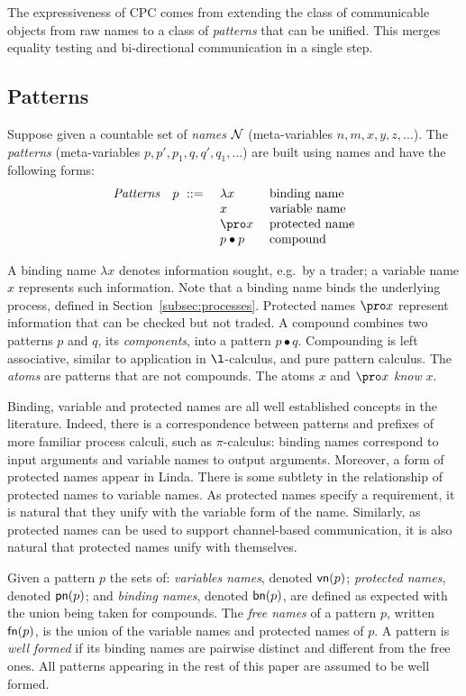 \documentclass{LMCS}
\begin{document}
The expressiveness of CPC comes from extending the class of
communicable objects from raw names to a class of {\em patterns} that
can be unified. This merges equality testing and bi-directional
communication in a single step.


\subsection{Patterns}

Suppose given a countable set of {\em names} ${\cal N}$ (meta-variables $n,m,x,y,z,\ldots$).
The {\em patterns} (meta-variables $p,p',p_1,q,q',q_1,\ldots$)
are built using names and have the following forms:
\[
\begin{array}{lll}
{\it Patterns}\quad p \ ::= \
&	\lambda x					& \mbox{binding name} \\
&	x									& \mbox{variable name} \\
&	\pro x						& \mbox{protected name} \\
&	p\bullet p \quad	& \mbox{compound}
\end{array}
\]

A binding name $\lambda x$ denotes information sought, e.g.\ by a
trader; a variable name $x$ represents such information. Note that a
binding name binds the underlying process, defined in
Section~\ref{subsec:processes}.  Protected names $\pro x$ represent
information that can be checked but not traded.  A compound combines
two patterns $p$ and $q$, its {\em components}, into a pattern
$p\bullet q$.  Compounding is left associative, similar to application
in $\l$-calculus, and pure pattern calculus.
The {\em atoms} are patterns that are not compounds.  The
atoms $x$ and $\pro x$ {\em know} $x$.

Binding, variable and protected names are all well established
concepts in the literature. Indeed, there is a correspondence between
patterns and prefixes of more familiar process calculi, such as
$\pi$-calculus: binding names correspond to input arguments and
variable names to output arguments.  Moreover, a form of protected
names appear in Linda.
There is some subtlety in the relationship of protected names to
variable names.  As protected names specify a requirement, it is
natural that they unify with the variable form of the name.
Similarly, as protected names can be used to support
channel-based communication, it is also natural that protected names
unify with themselves.


Given a pattern $p$ the sets of: {\em variables names}, denoted ${\sf
  vn}(p)$; {\em protected names}, denoted ${\sf pn}(p)$; and {\em
  binding names}, denoted ${\sf bn}(p)$, are defined as expected with
the union being taken for compounds.  The {\em free names} of a
pattern $p$, written ${\sf fn}(p)$, is the union of the variable names
and protected names of $p$.  A pattern is {\em well formed} if its
binding names are pairwise distinct and different from the free ones.
All patterns appearing in the rest of this paper are assumed to be
well formed.
\end{document}
